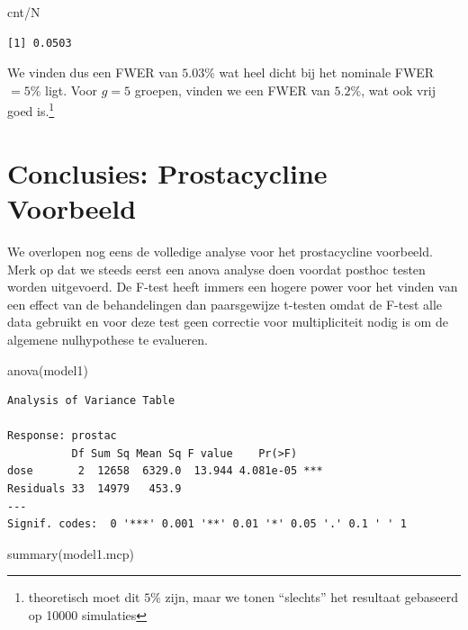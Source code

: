 \documentclass[
  dutch,
  letterpaper,
  12pt]{book}
\newenvironment{Shaded}{\begin{snugshade}}{\end{snugshade}}
\newcommand{\FunctionTok}[1]{\textcolor[rgb]{0.28,0.35,0.67}{#1}}
\newcommand{\NormalTok}[1]{\textcolor[rgb]{0.00,0.23,0.31}{#1}}
\newcommand{\SpecialCharTok}[1]{\textcolor[rgb]{0.37,0.37,0.37}{#1}}
\theoremstyle{definition}
\theoremstyle{definition}
\theoremstyle{definition}
\theoremstyle{remark}
\begin{document}
\begin{Shaded}
\begin{Highlighting}[]
\NormalTok{cnt}\SpecialCharTok{/}\NormalTok{N}
\end{Highlighting}
\end{Shaded}

\begin{verbatim}
[1] 0.0503
\end{verbatim}

We vinden dus een FWER van \(5.03\%\) wat heel dicht bij het nominale
FWER\(=5\%\) ligt. Voor \(g=5\) groepen, vinden we een FWER van
\(5.2\%\), wat ook vrij goed is.\footnote{theoretisch moet dit \(5\%\)
  zijn, maar we tonen ``slechts'' het resultaat gebaseerd op 10000
  simulaties}

\section{Conclusies: Prostacycline
Voorbeeld}\label{conclusies-prostacycline-voorbeeld}

We overlopen nog eens de volledige analyse voor het prostacycline
voorbeeld. Merk op dat we steeds eerst een anova analyse doen voordat
posthoc testen worden uitgevoerd. De F-test heeft immers een hogere
power voor het vinden van een effect van de behandelingen dan
paarsgewijze t-testen omdat de F-test alle data gebruikt en voor deze
test geen correctie voor multipliciteit nodig is om de algemene
nulhypothese te evalueren.

\begin{Shaded}
\begin{Highlighting}[]
\FunctionTok{anova}\NormalTok{(model1)}
\end{Highlighting}
\end{Shaded}

\begin{verbatim}
Analysis of Variance Table

Response: prostac
          Df Sum Sq Mean Sq F value    Pr(>F)    
dose       2  12658  6329.0  13.944 4.081e-05 ***
Residuals 33  14979   453.9                      
---
Signif. codes:  0 '***' 0.001 '**' 0.01 '*' 0.05 '.' 0.1 ' ' 1
\end{verbatim}

\begin{Shaded}
\begin{Highlighting}[]
\FunctionTok{summary}\NormalTok{(model1.mcp)}
\end{Highlighting}
\end{Shaded}
\end{document}
